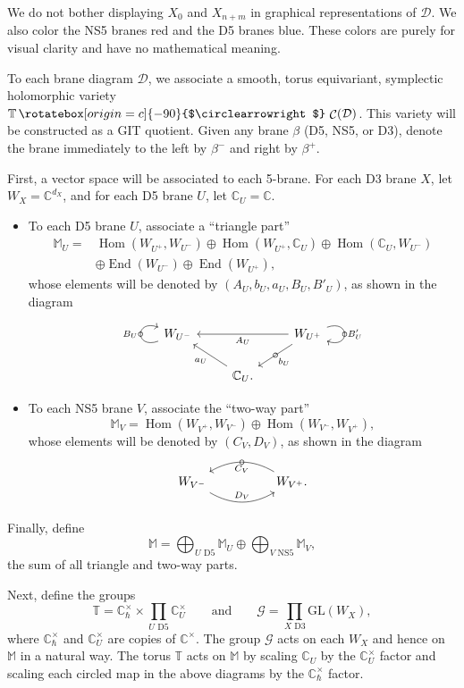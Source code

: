 \documentclass[pdftex]{sigma}
\numberwithin{equation}{section}
\newcommand{\brane}{\mathcal D}
\newcommand{\CC}{\mathbb C}
\newcommand{\torus}{\mathbb T}
\newcommand{\MM}{\mathbb M}
\newcommand{\G}{\mathcal G}
\DeclareMathOperator{\bowvar}{\mathcal C}
\DeclareMathOperator{\Hom}{Hom}
\DeclareMathOperator{\End}{End}
\begin{document}
We do not bother displaying $X_0$ and $X_{n + m}$ in graphical representations of $\brane$. We also color the NS5 branes red and the D5 branes blue. These colors are purely for visual clarity and have no mathematical meaning.

To each brane diagram $\brane$, we associate a smooth, torus equivariant, symplectic holomorphic variety $\torus\, \rotatebox[origin=c]{-90}{$\circlearrowright$}\,\bowvar(\brane)$. This variety will be constructed as a GIT quotient. Given any brane $\beta$ (D5, NS5, or D3), denote the brane immediately to the left by $\beta^-$ and right by $\beta^+$.


First, a vector space will be associated to each 5-brane. For each D3 brane $X$, let $W_X = \CC^{d_X}$, and for each D5 brane $U$, let $\CC_U = \CC$.
\begin{itemize}\itemsep=0pt
\item To each D5 brane $U$, associate a ``triangle part''
\begin{align*}
\MM_U={}&\Hom(W_{U^+},W_{U^-}) \oplus
\Hom(W_{U^+},\CC_U) \oplus \Hom(\CC_U,W_{U^-}) \\
& \oplus\End(W_{U^-}) \oplus \End(W_{U^+}),
\end{align*}
whose elements will be denoted by $(A_U, b_U, a_U, B_U, B'_U)$, as shown in the diagram
\[
\begin{tikzcd}
W_{U^-} \arrow[loop,out=200,in=160,distance=2em, "B_U", "\circ" marking] & & W_{U^+} \arrow[ld, "\circ" marking, "b_U" ] \arrow[ll, "A_U"] \arrow[loop,out=20,in=-20,distance=2em, "B'_U", "\circ" marking] \\
& \CC_U.\arrow[ul, "a_U"] &
\end{tikzcd}
\]

\item To each NS5 brane $V$, associate the ``two-way part''
\[
\MM_V= \Hom(W_{V^+},W_{V^-}) \oplus
\Hom(W_{V^-},W_{V^+}),
\]
whose elements will be denoted by $(C_V, D_V)$, as shown in the diagram
\[
\begin{tikzcd}
W_{V^-} \ar[rr,bend right, "D_V"] & & W_{V^+}. \ar[ll, "C_V", bend right, "\circ" marking]
\end{tikzcd}
\]
\end{itemize}
Finally, define
\[
\MM=\bigoplus_{U\text{ D5}}\MM_U \oplus \bigoplus_{V\text{ NS5}}\MM_V,
\]
the sum of all triangle and two-way parts.

Next, define the groups
\[
\torus = \CC_\hbar^\times \times \prod_{U \text{ D5}}\CC_U^\times \qquad\text{and}\qquad \G = \prod_{X \text{ D3}} \mathrm{GL}(W_X),
\]
where $\CC_\hbar^\times$ and $\CC^\times_U$ are copies of $\CC^\times$. The group $\G$ acts on each $W_X$ and hence on $\MM$ in a natural way. The torus $\torus$ acts on $\MM$ by scaling $\CC_U$ by the $\CC_U^\times$ factor and scaling each circled map in the above diagrams by the $\CC^\times_\hbar$ factor.
\end{document}
